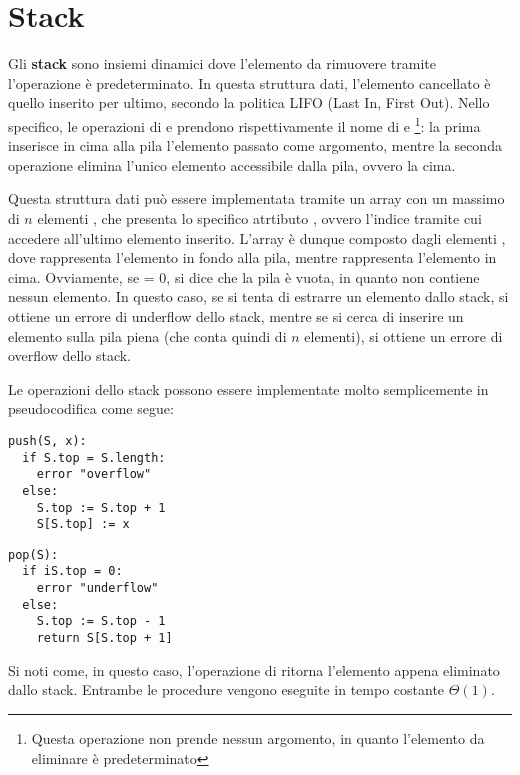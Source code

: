 \section{Stack}
Gli \textbf{stack} sono insiemi dinamici dove l'elemento da rimuovere tramite l'operazione  è predeterminato. In questa struttura dati, l'elemento cancellato è quello inserito per ultimo, secondo la politica LIFO (Last In, First Out). Nello specifico, le operazioni di  e  prendono rispettivamente il nome di  e  \footnote{Questa operazione non prende nessun argomento, in quanto l'elemento da eliminare è predeterminato}: la prima inserisce in cima alla pila l'elemento passato come argomento, mentre la seconda operazione elimina l'unico elemento accessibile dalla pila, ovvero la cima. 

Questa struttura dati può essere implementata tramite un array con un massimo di \(n\) elementi , che presenta lo specifico atrtibuto , ovvero l'indice tramite cui accedere all'ultimo elemento inserito. L'array è dunque composto dagli elementi , dove  rappresenta l'elemento in fondo alla pila, mentre  rappresenta l'elemento in cima. Ovviamente, se  = 0, si dice che la pila è vuota, in quanto non contiene nessun elemento. In questo caso, se si tenta di estrarre un elemento dallo stack, si ottiene un errore di underflow dello stack, mentre se si cerca di inserire un elemento sulla pila piena (che conta quindi di \(n\) elementi), si ottiene un errore di overflow dello stack.

Le operazioni dello stack possono essere implementate molto semplicemente in pseudocodifica come segue:

\begin{lstlisting}
push(S, x):
  if S.top = S.length:
    error "overflow"
  else:
    S.top := S.top + 1
    S[S.top] := x
\end{lstlisting}

\begin{lstlisting}
pop(S):
  if iS.top = 0:
    error "underflow"
  else:
    S.top := S.top - 1
    return S[S.top + 1]
\end{lstlisting}

Si noti come, in questo caso, l'operazione di  ritorna l'elemento appena eliminato dallo stack. Entrambe le procedure vengono eseguite in tempo costante \(\Theta(1)\).

